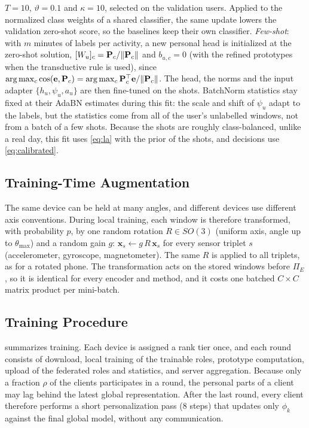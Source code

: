 $T=10$, $\vartheta=0.1$ and $\kappa=10$, selected on the validation users. Applied to the
normalized class weights of a shared classifier, the same update lowers the validation zero-shot
score, so the baselines keep their own classifier.
\emph{Few-shot}: with $m$ minutes of labels per activity, a new personal head is initialized at the
zero-shot solution, $[W_u]_c=\mathbf{P}_c/\lVert \mathbf{P}_c\rVert$ and $b_{u,c}=0$ (with the refined
prototypes when the transductive rule is used), since
$\arg\max_c\cos(\mathbf{e},\mathbf{P}_c)=\arg\max_c\mathbf{P}_c^\top\mathbf{e}/\lVert \mathbf{P}_c\rVert$. The head, the
norms and the input adapter $\{h_u,\psi_u,a_u\}$ are then fine-tuned on the shots. BatchNorm
statistics stay fixed at their AdaBN estimates during this fit: the scale and shift of $\psi_u$
adapt to the labels, but the statistics come from all of the user's unlabelled windows, not from a
batch of a few shots. Because the
shots are roughly class-balanced, unlike a real day, this fit uses \cref{eq:la} with the prior of
the shots, and decisions use \cref{eq:calibrated}.

\subsection{Training-Time Augmentation}\label{sec:method:augment}

The same device can be held at many angles, and different devices use different axis
conventions. During local training, each window is therefore transformed, with probability $p$,
by one random rotation $R\in SO(3)$ (uniform axis, angle up to $\theta_{\max}$) and a random gain $g$:
$\mathbf{x}_{s}\leftarrow g\,R\,\mathbf{x}_{s}$ for every sensor triplet $s$ (accelerometer, gyroscope,
magnetometer). The same $R$ is applied to all triplets, as for a rotated phone. The
transformation acts on the stored windows before $\Pi_E$, so it is identical for every encoder and
method, and it costs one batched $C\times C$ matrix product per mini-batch.

\subsection{Training Procedure}\label{sec:method:algorithm}

 summarizes training. Each device is assigned a rank tier once, and each round
consists of download, local training of the trainable roles, prototype computation, upload of
the federated roles and statistics, and server aggregation. Because only a fraction $\rho$ of the
clients participates in a round, the personal parts of a client may lag behind the latest global
representation. After the last round, every client therefore performs a short personalization
pass ($8$ steps) that updates only $\phi_k$ against the final global model, without any
communication.

